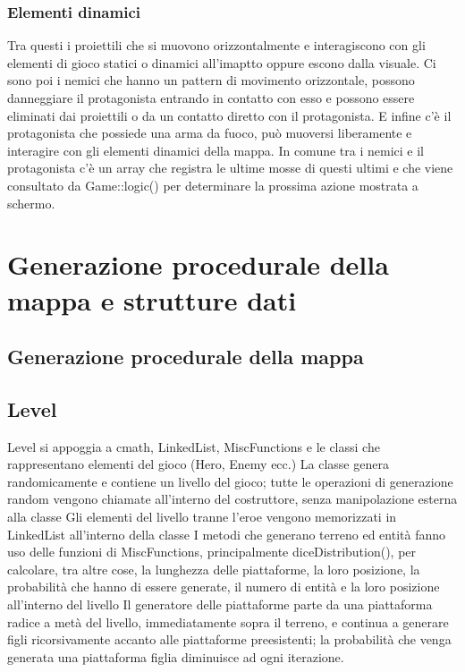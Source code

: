 \documentclass[12pt]{article}
\begin{document}
\subsubsection{Elementi dinamici}
Tra questi i proiettili che si muovono orizzontalmente e interagiscono con gli elementi di gioco statici o dinamici all'imaptto oppure escono dalla visuale.
Ci sono poi i nemici che hanno un pattern di movimento orizzontale, possono danneggiare il protagonista entrando in contatto con esso e possono essere eliminati dai proiettili o da un contatto diretto con il protagonista.
E infine c'è il protagonista che possiede una arma da fuoco, può muoversi liberamente e interagire con gli elementi dinamici della mappa.
In comune tra i nemici e il protagonista c'è un array che registra le ultime mosse di questi ultimi e che viene consultato da Game::logic() per determinare la prossima azione mostrata a schermo.

\section*{Generazione procedurale della mappa e strutture dati}
\subsection{Generazione procedurale della mappa}
\subsection{Level}
    Level si appoggia a cmath, LinkedList, MiscFunctions e le classi che rappresentano elementi del gioco (Hero, Enemy ecc.)
    La classe genera randomicamente e contiene un livello del gioco; tutte le operazioni di generazione random vengono chiamate all'interno del costruttore, senza manipolazione esterna alla classe
    Gli elementi del livello tranne l'eroe vengono memorizzati in LinkedList all'interno della classe
    I metodi che generano terreno ed entità fanno uso delle funzioni di MiscFunctions, principalmente diceDistribution(), per calcolare, tra altre cose, la lunghezza delle piattaforme, la loro posizione, la probabilità che hanno di essere generate, il numero di entità e la loro posizione all'interno del livello
    Il generatore delle piattaforme parte da una piattaforma radice a metà del livello, immediatamente sopra il terreno, e continua a generare figli ricorsivamente accanto alle piattaforme preesistenti; la probabilità che venga generata una piattaforma figlia diminuisce ad ogni iterazione.
\end{document}
